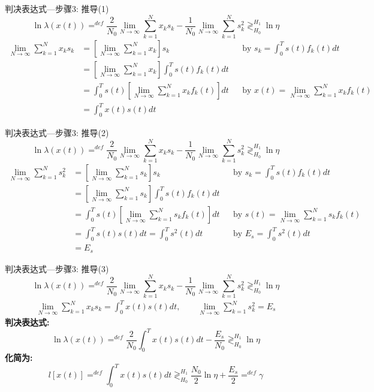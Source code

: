 \begin{frame}{判决表达式---步骤3: 推导(1)}
\[\ln\lambda(x(t))\mathop{=}^{def}
\frac{2}{N_0}\lim\limits_{N\to\infty}\sum\limits_{k=1}^{N}x_ks_k-\frac{1}{N_0}\lim\limits_{N\to\infty}\sum\limits_{k=1}^{N}s_k^2\mathop{\gtrless}_{H_0}^{H_1}\ln\eta \]
\begin{align*}
\lim\limits_{N\to\infty}\sum\limits_{k=1}^{N}x_ks_k&=\left[\lim\limits_{N\to\infty}\sum\limits_{k=1}^{N}x_k\right]s_k &&\text{by }s_k=\int_{0}^{T}s(t)f_k(t)dt \\
&=\left[\lim\limits_{N\to\infty}\sum\limits_{k=1}^{N}x_k\right]\int_{0}^{T}s(t)f_k(t)dt\\
&=\int_{0}^{T}s(t)\left[\lim\limits_{N\to\infty}\sum\limits_{k=1}^{N}x_kf_k(t)\right]dt &&\text{by }x(t)=\lim\limits_{N\to\infty}\sum\limits_{k=1}^Nx_kf_k(t)\\
&=\int_{0}^{T}x(t)s(t)dt
\end{align*}
\end{frame}

\begin{frame}{判决表达式---步骤3: 推导(2)}
\[\ln\lambda(x(t))\mathop{=}^{def}
\frac{2}{N_0}\lim\limits_{N\to\infty}\sum\limits_{k=1}^{N}x_ks_k-\frac{1}{N_0}\lim\limits_{N\to\infty}\sum\limits_{k=1}^{N}s_k^2\mathop{\gtrless}_{H_0}^{H_1}\ln\eta \]
\begin{align*}
\lim\limits_{N\to\infty}\sum\limits_{k=1}^{N}s_k^2&=\left[\lim\limits_{N\to\infty}\sum\limits_{k=1}^{N}s_k\right]s_k &&\text{by }s_k=\int_{0}^{T}s(t)f_k(t)dt \\
&=\left[\lim\limits_{N\to\infty}\sum\limits_{k=1}^{N}s_k\right]\int_{0}^{T}s(t)f_k(t)dt\\
&=\int_{0}^{T}s(t)\left[\lim\limits_{N\to\infty}\sum\limits_{k=1}^{N}s_kf_k(t)\right]dt &&\text{by }s(t)=\lim\limits_{N\to\infty}\sum\limits_{k=1}^Ns_kf_k(t)\\
&=\int_{0}^{T}s(t)s(t)dt=\int_{0}^{T}s^2(t)dt &&\text{by }E_s=\int_{0}^{T}s^2(t)dt\\
&=E_s
\end{align*}
\end{frame}

\begin{frame}{判决表达式---步骤3: 推导(3)}
\[\ln\lambda(x(t))\mathop{=}^{def}
\frac{2}{N_0}\lim\limits_{N\to\infty}\sum\limits_{k=1}^{N}x_ks_k-\frac{1}{N_0}\lim\limits_{N\to\infty}\sum\limits_{k=1}^{N}s_k^2\mathop{\gtrless}_{H_0}^{H_1}\ln\eta \]
\begin{align*}
\lim\limits_{N\to\infty}\sum\limits_{k=1}^{N}x_ks_k=\int_{0}^{T}x(t)s(t)dt, \qquad \lim\limits_{N\to\infty}\sum\limits_{k=1}^{N}s_k^2=E_s
\end{align*}
\textbf{判决表达式:}
\[\ln\lambda(x(t))\mathop{=}^{def}\frac{2}{N_0}\int_{0}^{T}x(t)s(t)dt-\frac{E_s}{N_0}\mathop{\gtrless}_{H_0}^{H_1}\ln\eta\]
\textbf{化简为:}
\[l[x(t)]\mathop{=}^{def}\int_{0}^{T}x(t)s(t)dt\mathop{\gtrless}_{H_0}^{H_1}\frac{N_0}{2}\ln\eta+\frac{E_s}{2}\mathop{=}^{def}\gamma\]
\end{frame}


